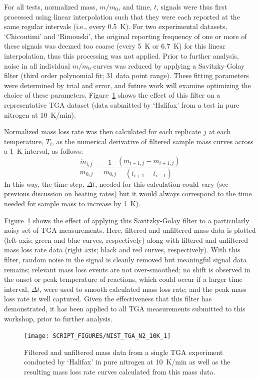 \documentclass{book}
\begin{document}
For all tests, normalized mass, $m/m_0$, and time, $t$, signals were thus first processed using linear interpolation such that they were each reported at the same regular intervals (i.e., every 0.5~K). For two experimental datasets, ‘Chicoutimi’ and ‘Rimouski', the original reporting frequency of one or more of these signals was deemed too coarse (every 5~K or 6.7~K) for this linear interpolation, thus this processing was not applied.
Prior to further analysis, noise in all individual $m/m_0$ curves was reduced by applying a Savitzky-Golay filter (third order polynomial fit; 31 data point range). These fitting parameters were determined by trial and error, and future work will examine optimizing the choice of these parameters. Figure~\ref{Fig:TGA_N2_10K_1} shows the effect of this filter on a representative TGA dataset (data submitted by ‘Halifax’ from a test in pure nitrogen at 10~K/min).

Normalized mass loss rate was then calculated for each replicate $j$ at each temperature, $T_i$, as the numerical derivative of filtered sample mass curves across a 1~K interval, as follows: 
\begin{equation}
   \frac{\dot{m}_{i,j}}{m_{0,j}} = \frac{1}{m_{0,j}}\frac{\left(m_{i-1,j}-m_{i+1,j}\right)}{\left(t_{i+1}-t_{i-1}\right)}
\end{equation}
In this way, the time step, $\Delta t$, needed for this calculation could vary (see previous discussion on heating rates) but it would always correspond to the time needed for sample mass to increase by 1~K).

Figure~\ref{Fig:TGA_N2_10K_1} shows the effect of applying this Savitzky-Golay filter to a particularly noisy set of TGA measurements. Here, filtered and unfiltered mass data is plotted (left axis; green and blue curves, respectively) along with filtered and unfiltered mass loss rate data (right axis; black and red curves, respectively). With this filter, random noise in the signal is cleanly removed but meaningful signal data remains; relevant mass loss events are not over-smoothed; no shift is observed in the onset or peak temperature of reactions, which could occur if a larger time interval, $\Delta t$, were used to smooth calculated mass loss rate; and the peak mass loss rate is well captured. Given the effectiveness that this filter has demonstrated, it has been applied to all TGA measurements submitted to this workshop, prior to further analysis.

\begin{figure}[h!]
  \centering
  \texttt{[image: SCRIPT\_FIGURES/NIST\_TGA\_N2\_10K\_1]}
  \caption{Filtered and unfiltered mass data from a single TGA experiment conducted by ‘Halifax’ in pure nitrogen at 10~K/min as well as the resulting mass loss rate curves calculated from this mass data.}
  \label{Fig:TGA_N2_10K_1}
\end{figure}
\end{document}
